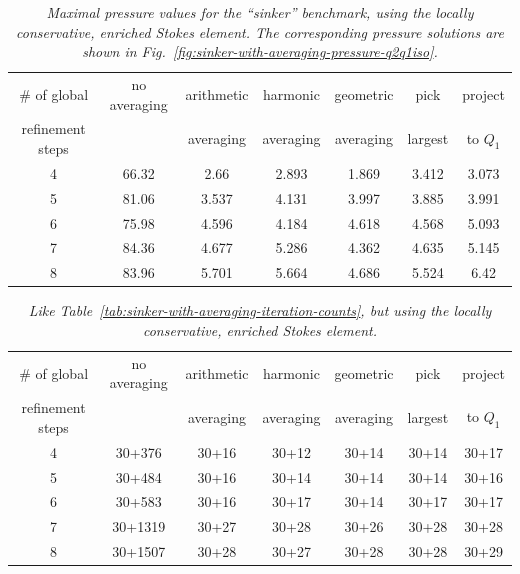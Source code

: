 \documentclass{article}
\begin{document}
\begin{table}[htb]
  \center
  \begin{tabular}{|c|cccccc|}
    \hline
    \# of global & no averaging & arithmetic & harmonic & geometric
    & pick & project \\
    refinement steps & & averaging & averaging &
    averaging & largest & to $Q_1$
    \\ \hline
    4 & 66.32 & 2.66 & 2.893 & 1.869 & 3.412 & 3.073 \\
    5 & 81.06 & 3.537 & 4.131 & 3.997 & 3.885 & 3.991 \\
    6 & 75.98 & 4.596 & 4.184 & 4.618 & 4.568 & 5.093 \\
    7 & 84.36 & 4.677 & 5.286 & 4.362 & 4.635 & 5.145 \\
    8 & 83.96 & 5.701 & 5.664 & 4.686 & 5.524 & 6.42 \\ \hline
  \end{tabular}
  \caption{\it Maximal pressure values for the ``sinker'' benchmark, using the
  locally conservative, enriched Stokes element. The corresponding
  pressure solutions are shown in
  Fig.~\ref{fig:sinker-with-averaging-pressure-q2q1iso}.}
  \label{tab:sinker-with-averaging-max-pressure-q2q1iso}
\end{table}


\begin{table}[htb]
  \center
  \begin{tabular}{|c|cccccc|}
    \hline
    \# of global & no averaging & arithmetic & harmonic & geometric
    & pick & project \\
    refinement steps & & averaging & averaging &
    averaging & largest & to $Q_1$
    \\ \hline
    4 & 30+376 & 30+16 & 30+12 & 30+14 & 30+14 & 30+17 \\
    5 & 30+484 & 30+16 & 30+14 & 30+14 & 30+14 & 30+16 \\
    6 & 30+583 & 30+16 & 30+17 & 30+14 & 30+17 & 30+17 \\
    7 & 30+1319 & 30+27 & 30+28 & 30+26 & 30+28 & 30+28 \\
    8 & 30+1507 & 30+28 & 30+27 & 30+28 & 30+28 & 30+29  \\ \hline
  \end{tabular}
  \caption{\it Like Table~\ref{tab:sinker-with-averaging-iteration-counts}, but
  using the locally conservative, enriched Stokes element.}
  \label{tab:sinker-with-averaging-iteration-counts-q2q1iso}
\end{table}
\end{document}

